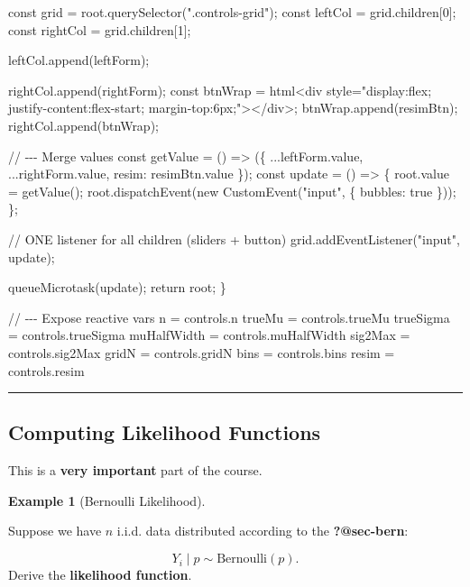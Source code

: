 \documentclass[
  letterpaper,
  DIV=11,
  numbers=noendperiod]{scrreprt}
\newenvironment{Shaded}{\begin{snugshade}}{\end{snugshade}}
\newcommand{\NormalTok}[1]{\textcolor[rgb]{0.00,0.23,0.31}{#1}}
\theoremstyle{definition}
\newtheorem{example}{Example}[chapter]
\theoremstyle{plain}
\theoremstyle{definition}
\theoremstyle{remark}
\begin{document}
\begin{Shaded}
\begin{Highlighting}[]
\NormalTok{  const grid = root.querySelector(".controls{-}grid");}
\NormalTok{  const leftCol = grid.children[0];}
\NormalTok{  const rightCol = grid.children[1];}

\NormalTok{  leftCol.append(leftForm);}

\NormalTok{  rightCol.append(rightForm);}
\NormalTok{  const btnWrap = html\textasciigrave{}\textless{}div style="display:flex; justify{-}content:flex{-}start; margin{-}top:6px;"\textgreater{}\textless{}/div\textgreater{}\textasciigrave{};}
\NormalTok{  btnWrap.append(resimBtn);}
\NormalTok{  rightCol.append(btnWrap);}

\NormalTok{  // {-}{-}{-} Merge values}
\NormalTok{  const getValue = () =\textgreater{} (\{ ...leftForm.value, ...rightForm.value, resim: resimBtn.value \});}
\NormalTok{  const update = () =\textgreater{} \{}
\NormalTok{    root.value = getValue();}
\NormalTok{    root.dispatchEvent(new CustomEvent("input", \{ bubbles: true \}));}
\NormalTok{  \};}

\NormalTok{  // ONE listener for all children (sliders + button)}
\NormalTok{  grid.addEventListener("input", update);}

\NormalTok{  queueMicrotask(update);}
\NormalTok{  return root;}
\NormalTok{\}}

\NormalTok{// {-}{-}{-} Expose reactive vars}
\NormalTok{n = controls.n}
\NormalTok{trueMu = controls.trueMu}
\NormalTok{trueSigma = controls.trueSigma}
\NormalTok{muHalfWidth = controls.muHalfWidth}
\NormalTok{sig2Max = controls.sig2Max}
\NormalTok{gridN = controls.gridN}
\NormalTok{bins = controls.bins}
\NormalTok{resim = controls.resim}

\end{Highlighting}
\end{Shaded}

\begin{center}\rule{0.5\linewidth}{0.5pt}\end{center}

\subsection{Computing Likelihood
Functions}\label{computing-likelihood-functions}

This is a \textbf{very important} part of the course.

\begin{example}[Bernoulli
Likelihood]\protect\hypertarget{exm-bern-likelihood}{}\label{exm-bern-likelihood}

Suppose we have \(n\) i.i.d. data distributed according to the
{\textbf{?@sec-bern}}:

\[
  Y_i \mid p \sim \textrm{Bernoulli}(p).
\] Derive the \textbf{likelihood function}.

\end{example}
\end{document}
